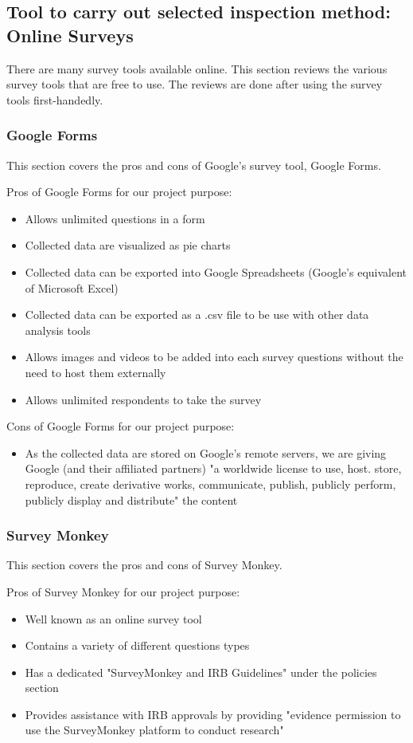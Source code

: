 \documentclass[10pt,journal,compsoc,draftclsnofoot]{IEEEtran}
\begin{document}
\newpage

\subsection{Tool to carry out selected inspection method: Online Surveys}
There are many survey tools available online.
This section reviews the various survey tools that are free to use.
The reviews are done after using the survey tools first-handedly.

\subsubsection{Google Forms}
This section covers the pros and cons of Google's survey tool, Google Forms.

Pros of Google Forms for our project purpose:
\begin{itemize}
\item Allows unlimited questions in a form
\item Collected data are visualized as pie charts
\item Collected data can be exported into Google Spreadsheets (Google's equivalent of Microsoft Excel)
\item Collected data can be exported as a .csv file to be use with other data analysis tools
\item Allows images and videos to be added into each survey questions without the need to host them externally
\item Allows unlimited respondents to take the survey
\end{itemize}

Cons of Google Forms for our project purpose:
\begin{itemize}
\item As the collected data are stored on Google's remote servers, we are giving Google (and their affiliated partners) "a worldwide license to use, host. store, reproduce, create derivative works, communicate, publish, publicly perform, publicly display and distribute" the content \cite{google}
\end{itemize}

\subsubsection{Survey Monkey}
This section covers the pros and cons of Survey Monkey.

Pros of Survey Monkey for our project purpose:
\begin{itemize}
\item Well known as an online survey tool
\item Contains a variety of different questions types
\item Has a dedicated "SurveyMonkey and IRB Guidelines" under the policies section
\item Provides assistance with IRB approvals by providing "evidence permission to use the SurveyMonkey platform to conduct research" \cite{surveymonkey}
\end{itemize}
\end{document}
